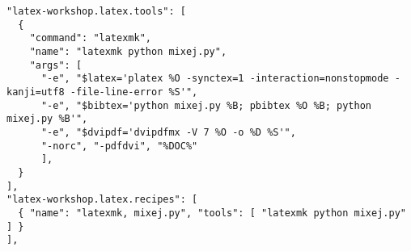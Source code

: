 \documentclass[10pt, a4paper]{jsarticle}
\begin{document}
\noindent\makebox[\linewidth]{\rule{\linewidth}{0.4pt}}\vspace{-0.5zw}
\begin{lstlisting}[style=onecol]
"latex-workshop.latex.tools": [
  {
    "command": "latexmk",
    "name": "latexmk python mixej.py",
    "args": [
      "-e", "$latex='platex %O -synctex=1 -interaction=nonstopmode -kanji=utf8 -file-line-error %S'",
      "-e", "$bibtex='python mixej.py %B; pbibtex %O %B; python mixej.py %B'",
      "-e", "$dvipdf='dvipdfmx -V 7 %O -o %D %S'",
      "-norc", "-pdfdvi", "%DOC%"
      ],
  }
],
"latex-workshop.latex.recipes": [
  { "name": "latexmk, mixej.py", "tools": [ "latexmk python mixej.py" ] }
],
\end{lstlisting}\vspace{-1.8zw}
\noindent\makebox[\linewidth]{\rule{\linewidth}{0.4pt}}\vspace{0.5zw}\par
\end{document}
